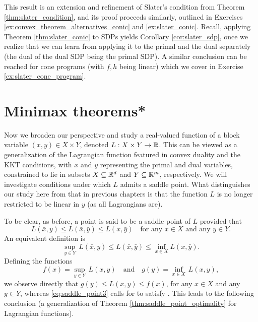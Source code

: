 This result is an extension and refinement of Slater's condition from Theorem 
\ref{thm:slater_condition}, and its proof proceeds similarly, outlined in
Exercises \ref{ex:convex_theorem_alternatives_conic} and \ref{ex:slater_conic}.  
Recall, applying Theorem \ref{thm:slater_conic} to SDPs yields Corollary 
\ref{cor:slater_sdp}, once we realize that we can learn from applying it to the
primal and the dual separately (the dual of the dual SDP being the primal SDP). 
A similar conclusion can be reached for cone programs (with $f,h$ being linear)
which we cover in Exercise \ref{ex:slater_cone_program}.

\section{Minimax theorems*}
\label{sec:minimax_theorems}

Now we broaden our perspective and study a real-valued function of a block
variable $(x,y) \in X \times Y$, denoted $L : X \times Y \to \mathbb{R}$. This can be
viewed as a generalization of the Lagrangian function featured in convex duality 
and the KKT conditions, with $x$ and $y$ representing the primal and dual
variables, constrained to lie in subsets $X \subseteq \mathbb{R}^d$ and $Y \subseteq  
\mathbb{R}^m$, respectively. We will investigate conditions under which $L$ admits a 
saddle point. What distinguishes our study here from that in previous chapters
is that the function $L$ is no longer restricted to be linear in $y$ (as all
Lagrangians are).     

To be clear, as before, a point  is
said to be a saddle point of $L$ provided that  
\begin{equation}
\label{eq:saddle_point2}
L(\bar{x}, y) \leq L(\bar{x}, \bar{y}) \leq L(x, \bar{y}) \quad \text{for any
  $x \in X$ and any $y \in Y$}. 
\end{equation}
An equivalent definition is 
\begin{equation}
\label{eq:saddle_point3}
\sup_{y \in Y} \, L(\bar{x}, y) \leq L(\bar{x}, \bar{y}) \leq \inf_{x \in X}
L(x, \bar{y}). 
\end{equation}
Defining the functions
\begin{equation}
\label{eq:saddle_functions}
f(x) = \sup_{y \in Y} \, L(x,y) \quad \text{and} \quad 
g(y) = \inf_{x \in X} \, L(x,y),
\end{equation}
we observe directly that $g(y) \leq L(x,y) \leq f(x)$, for any $x \in X$ and any 
$y \in Y$, whereas \eqref{eq:saddle_point3} calls for  to satisfy . This leads to the following conclusion (a generalization of
Theorem \ref{thm:saddle_point_optimality} for Lagrangian functions). 

